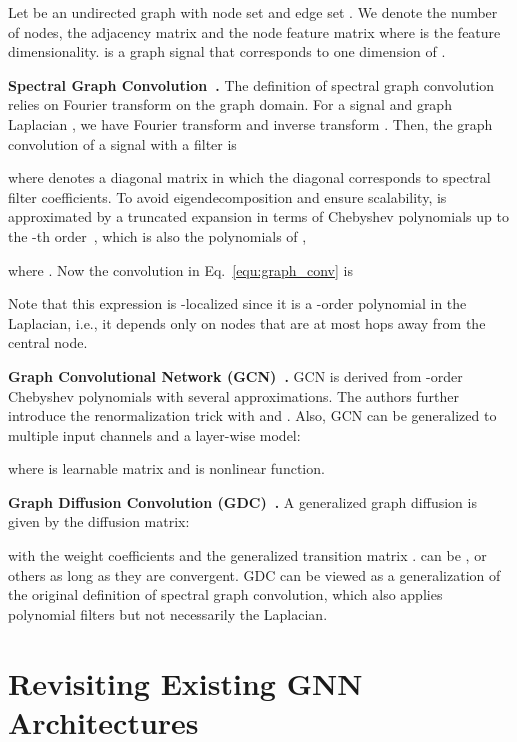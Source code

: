 \documentclass[nohyperref]{article}
\theoremstyle{plain}
\theoremstyle{definition}
\theoremstyle{remark}
\begin{document}
Let  be an undirected graph with node set  and edge set .
We denote  the number of nodes,  the adjacency matrix and  the node feature matrix where  is the feature dimensionality.
 is a graph signal that corresponds to one dimension of .

\textbf{Spectral Graph Convolution~\cite{hammond2011wavelets,defferrard2016convolutional}.}
The definition of spectral graph convolution relies on Fourier transform on the graph domain.
For a signal  and graph Laplacian , we have Fourier transform  and inverse transform .
Then, the graph convolution of a signal  with a filter  is

where  denotes a diagonal matrix in which the diagonal corresponds to spectral filter coefficients.
To avoid eigendecomposition and ensure scalability,  is approximated by a truncated expansion in terms of Chebyshev polynomials  up to the -th order~\cite{hammond2011wavelets}, which is also the polynomials of ,

where .
Now the convolution in Eq.~\ref{equ:graph_conv} is

Note that this expression is -localized since it is a -order polynomial in the Laplacian, i.e., it depends only on nodes that are at most  hops away from the central node.

\textbf{Graph Convolutional Network (GCN)~\cite{kipf2017semi}.}
GCN is derived from -order Chebyshev polynomials with several approximations.
The authors further introduce the renormalization trick  with  and .
Also, GCN can be generalized to multiple input channels and a layer-wise model:

where  is learnable matrix and  is nonlinear function.

\textbf{Graph Diffusion Convolution (GDC)~\cite{klicpera2019diffusion}.}
A generalized graph diffusion is given by the diffusion matrix:

with the weight coefficients  and the generalized transition matrix .
 can be ,  or others as long as they are convergent.
GDC can be viewed as a generalization of the original definition of spectral graph convolution, which also applies polynomial filters but not necessarily the Laplacian.


\section{Revisiting Existing GNN Architectures}
\end{document}
